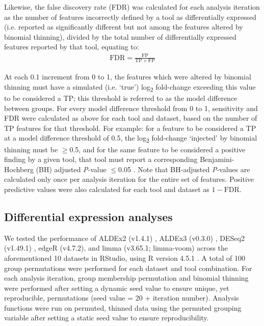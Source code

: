 \documentclass[10pt,letterpaper]{article}
\begin{document}
Likewise, the false discovery rate (FDR) was calculated for each analysis iteration as the number of features incorrectly defined by a tool as differentially expressed (i.e. reported as significantly different but not among the features altered by binomial thinning), divided by the total number of differentially expressed features reported by that tool, equating to: 
\begin{eqnarray}
	\label{eq:FDR}
	\mathrm{FDR} = \frac{\mathrm{FP}}{\mathrm{TP} + \mathrm{FP}}
 \end{eqnarray}
 
At each 0.1 increment from 0 to 1, the features which were altered by binomial thinning must have a simulated (i.e. `true') log\textsubscript{2} fold-change exceeding this value to be considered a TP; this threshold is referred to as the model difference between groups. For every model difference threshold from 0 to 1, sensitivity and FDR were calculated as above for each tool and dataset, based on the number of TP features for that threshold. For example: for a feature to be considered a TP at a model difference threshold of 0.5, the log\textsubscript{2} fold-change `injected' by binomial thinning must be $\geq$0.5, and for the same feature to be considered a positive finding by a given tool, that tool must report a corresponding Benjamini-Hochberg (BH) adjusted \textit{P}-value $\leq$0.05 \cite{benjamini:1995}. Note that BH-adjusted \textit{P}-values are calculated only once per analysis iteration for the entire set of features. Positive predictive values were also calculated for each tool and dataset as $1 - \mathrm{FDR}$.

\subsection*{Differential expression analyses}
We tested the performance of ALDEx2 (v1.4.1) \cite{fernandes:2014}, ALDEx3 (v0.3.0) \cite{konnaris_uncertainty_2025}, DESeq2 (v1.49.1) \cite{love_moderated_2014}, edgeR (v4.7.2), and limma (v3.65.1; limma-voom) \cite{ritchie_limma_2015} across the aforementioned 10 datasets in RStudio, using R version 4.5.1 \cite{r_core_2025}. A total of 100 group permutations  were performed for each dataset and tool combination. For each analysis iteration, group membership permutation and binomial thinning were performed after setting a dynamic seed value to ensure unique, yet reproducible, permutations (seed value = 20 + iteration number). Analysis functions were run on permuted, thinned data using the permuted grouping variable after setting a static seed value to ensure reproducibility.
\end{document}

